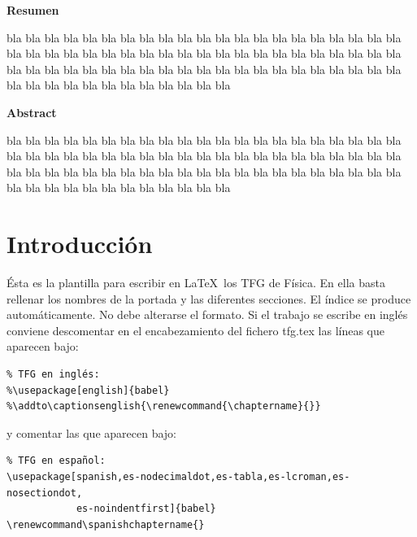 \documentclass[11pt,a4paper,twoside,pdf]{article}
\numberwithin{equation}{section}
\renewcommand\spanishchaptername{}
\begin{document}
\newpage
%
\begin{center}
{\bf Resumen}
\bigskip

\begin{minipage}{0.8\linewidth}
bla bla bla bla bla bla bla bla bla bla bla bla bla bla bla
bla bla bla bla bla bla bla bla bla bla bla bla bla bla bla
bla bla bla bla bla bla bla bla bla bla bla bla bla bla bla 
bla bla bla bla bla bla bla bla bla bla bla bla bla bla bla
bla bla bla bla bla bla bla bla bla bla bla bla bla bla bla
\end{minipage}

\vfill

{\bf Abstract} 
\bigskip

\begin{minipage}{0.8\linewidth}
bla bla bla bla bla bla bla bla bla bla bla bla bla bla bla
bla bla bla bla bla bla bla bla bla bla bla bla bla bla bla
bla bla bla bla bla bla bla bla bla bla bla bla bla bla bla 
bla bla bla bla bla bla bla bla bla bla bla bla bla bla bla
bla bla bla bla bla bla bla bla bla bla bla bla bla bla bla
\end{minipage}

\vfill

\end{center}


\tableofcontents


\pagestyle{fancy}
\fancyhead[RO,LE]{\leftmark}
\fancyhead[LO,RE]{\thepage}
\fancyfoot{}

\section{Introducción}

Ésta es la plantilla para escribir en \LaTeX\ los TFG de Física. En ella basta rellenar los nombres de la portada y las diferentes secciones. El índice se produce automáticamente. No debe alterarse el formato. Si el trabajo se escribe en inglés conviene descomentar en el encabezamiento del fichero {\sf tfg.tex} las líneas que aparecen bajo:
\begin{verbatim}
% TFG en inglés:
%\usepackage[english]{babel} 
%\addto\captionsenglish{\renewcommand{\chaptername}{}}
\end{verbatim}
y comentar las que aparecen bajo:
\begin{verbatim}
% TFG en español:
\usepackage[spanish,es-nodecimaldot,es-tabla,es-lcroman,es-nosectiondot,
            es-noindentfirst]{babel}
\renewcommand\spanishchaptername{}
\end{verbatim}
\end{document}
